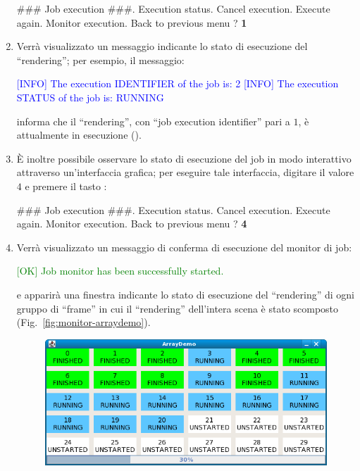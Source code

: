\begin{enumerate}
\begin{mgCodeBox}
\small
\#\#\# Job execution \#\#\#. Execution status. Cancel execution. Execute again. Monitor execution. Back to previous menu\newline
? \textbf{1}
\end{mgCodeBox}
\item Verr\`a visualizzato un messaggio indicante lo stato di esecuzione del ``rendering''; per esempio, il messaggio:
\begin{mgCodeBox}
\small
\textcolor{blue}{[INFO] The execution IDENTIFIER of the job is: 2}\newline
\textcolor{blue}{[INFO] The execution STATUS of the job is: RUNNING}
\end{mgCodeBox}
informa che il ``rendering'', con ``job execution identifier'' pari a $1$, \`e attualmente in esecuzione ().
\item \`E inoltre possibile osservare lo stato di esecuzione del job in modo interattivo attraverso un'interfaccia grafica; per eseguire tale interfaccia, digitare il valore $4$ e premere il tasto :
\begin{mgCodeBox}
\small
\#\#\# Job execution \#\#\#. Execution status. Cancel execution. Execute again. Monitor execution. Back to previous menu\newline
? \textbf{4}
\end{mgCodeBox}
\item Verr\`a visualizzato un messaggio di conferma di esecuzione del monitor di job:
\begin{mgCodeBox}
\small
\textcolor{green}{[OK] Job monitor has been successfully started.}
\end{mgCodeBox}
e apparir\`a una finestra indicante lo stato di esecuzione del ``rendering'' di ogni gruppo di ``frame'' in cui il ``rendering'' dell'intera scena \`e stato scomposto (Fig.~\ref{fig:monitor-arraydemo}).
\begin{figure}
\centering
\includegraphics{images/array3_monitor}

\end{figure}
\end{enumerate}
